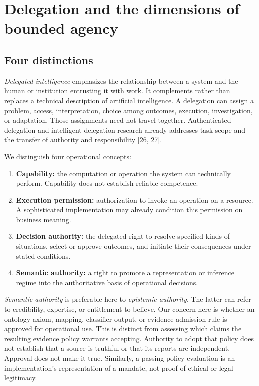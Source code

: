 \documentclass[
  english,
  12pt,
  a4paper,
  preprint,
  numbers,
  nopreprintline]{elsarticle}
\providecommand{\tightlist}{%
  \setlength{\itemsep}{0pt}\setlength{\parskip}{0pt}}
\begin{document}
\section{Delegation and the dimensions of bounded
agency}\label{delegation-and-the-dimensions-of-bounded-agency}

\subsection{Four distinctions}\label{four-distinctions}

\emph{Delegated intelligence} emphasizes the relationship between a
system and the human or institution entrusting it with work. It
complements rather than replaces a technical description of artificial
intelligence. A delegation can assign a problem, access, interpretation,
choice among outcomes, execution, investigation, or adaptation. Those
assignments need not travel together. Authenticated delegation and
intelligent-delegation research already addresses task scope and the
transfer of authority and responsibility {[}26, 27{]}.

We distinguish four operational concepts:

\begin{enumerate}
\def\labelenumi{\arabic{enumi}.}
\tightlist
\item
  \textbf{Capability:} the computation or operation the system can
  technically perform. Capability does not establish reliable
  competence.
\item
  \textbf{Execution permission:} authorization to invoke an operation on
  a resource. A sophisticated implementation may already condition this
  permission on business meaning.
\item
  \textbf{Decision authority:} the delegated right to resolve specified
  kinds of situations, select or approve outcomes, and initiate their
  consequences under stated conditions.
\item
  \textbf{Semantic authority:} a right to promote a representation or
  inference regime into the authoritative basis of operational
  decisions.
\end{enumerate}

\emph{Semantic authority} is preferable here to \emph{epistemic
authority}. The latter can refer to credibility, expertise, or
entitlement to believe. Our concern here is whether an ontology axiom,
mapping, classifier output, or evidence-admission rule is approved for
operational use. This is distinct from assessing which claims the
resulting evidence policy warrants accepting. Authority to adopt that
policy does not establish that a source is truthful or that its reports
are independent. Approval does not make it true. Similarly, a passing
policy evaluation is an implementation's representation of a mandate,
not proof of ethical or legal legitimacy.
\end{document}
